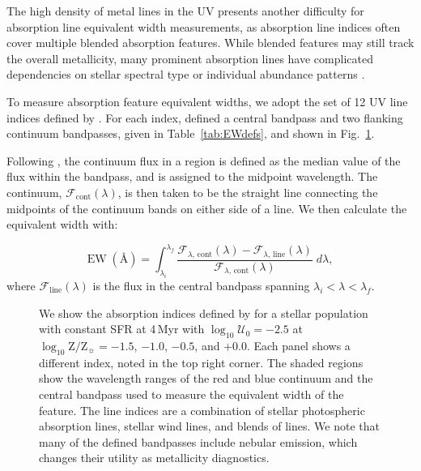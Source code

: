 \documentclass[preprint2]{aastex61}
\newcommand{\Myr}{$\,$Myr\xspace}
\newcommand{\logten}{\ensuremath{\log_{10}}}
\newcommand{\logZeq}[1]{\ensuremath{\logten \mathrm{Z}/\mathrm{Z}_{\sun} = #1}}
\newcommand{\ang}{\ensuremath{\mbox{\AA}}\xspace}
\newcommand{\logUeq}[1]{\ensuremath{\logten \mathcal{U}_0 = #1}}
\newcommand{\fcont}{\ensuremath{\mathcal{F}_{\mathrm{cont}}(\lambda)}\xspace}
\newcommand{\fline}{\ensuremath{\mathcal{F}_{\mathrm{line}}(\lambda)}\xspace}
\begin{document}
The high density of metal lines in the UV presents another difficulty for absorption line equivalent width measurements, as absorption line indices often cover multiple blended absorption features. While blended features may still track the overall metallicity, many prominent absorption lines have complicated dependencies on stellar spectral type or individual abundance patterns \citep{Maraston+2009}.

To measure absorption feature equivalent widths, we adopt the set of 12 UV line indices defined by \citet{Leitherer+2011}. For each index, \citet{Leitherer+2011} defined a central bandpass and two flanking continuum bandpasses, given in Table~\ref{tab:EWdefs}, and shown in Fig.~\ref{fig:lineIndex}.

Following \citet{Leitherer+2011}, the continuum flux in a region is defined as the median value of the flux within the bandpass, and is assigned to the midpoint wavelength. The continuum, \fcont, is then taken to be the straight line connecting the midpoints of the continuum bands on either side of a line. We then calculate the equivalent width with:

\begin{equation}
\mathrm{EW\;(\ang)} = \int^{\lambda_f}_{\lambda_i} \frac{\mathcal{F}_{\lambda,\,\mathrm{cont}}(\lambda) - \mathcal{F}_{\lambda,\,\mathrm{line}}(\lambda)}{\mathcal{F}_{\lambda,\,\mathrm{cont}}(\lambda)}\;d\lambda ,
\end{equation}
where \fline is the flux in the central bandpass spanning $\lambda_i < \lambda < \lambda_f$.

\begin{figure}
  \begin{center}
    \caption{We show the absorption indices defined by \citet{Leitherer+2011} for a stellar population with constant SFR at 4\Myr with \logUeq{-2.5} at \logZeq{-1.5}, $-1.0$, $-0.5$, and $+0.0$. Each panel shows a different index, noted in the top right corner. The shaded regions show the wavelength ranges of the red and blue continuum and the central bandpass used to measure the equivalent width of the feature. The line indices are a combination of stellar photospheric absorption lines, stellar wind lines, and blends of lines. We note that many of the defined bandpasses include nebular emission, which changes their utility as metallicity diagnostics.}
    \label{fig:lineIndex}
  \end{center}
\end{figure} 
\end{document}
